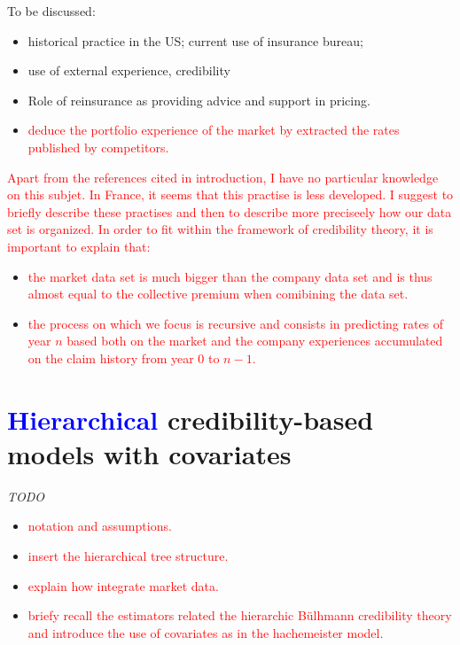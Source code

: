 \documentclass[
]{article}
\providecommand{\tightlist}{%
  \setlength{\itemsep}{0pt}\setlength{\parskip}{0pt}}
\begin{document}
To be discussed:

\begin{itemize}
\tightlist
\item
  historical practice in the US; current use of insurance bureau;
\item
  use of external experience, credibility
\item
  Role of reinsurance as providing advice and support in pricing.
\item
  \textcolor{red}{deduce the portfolio experience of the market by extracted the rates published by competitors.}
\end{itemize}

\textcolor{red}{Apart from the references cited in introduction, I have no particular knowledge on this subjet. In France, it seems that this practise is less developed. I suggest to briefly describe these practises and then to describe more preciseely how our data set is organized. In order to fit within the framework of credibility theory, it is important to explain that:}

\begin{itemize}
\tightlist
\item
  \textcolor{red}{the market data set is much bigger than the company data set and is thus almost equal to the collective premium when comibining the data set.}
\item
  \textcolor{red}{the process on which we focus is recursive and consists in predicting rates of year $n$ based both on the market and the company experiences accumulated on the claim history from year $0$ to $n-1$.}
\end{itemize}

\hypertarget{credibility-based-models-with-covariates}{%
\section{\texorpdfstring{\textcolor{blue}{Hierarchical}
credibility-based models with
covariates}{ credibility-based models with covariates}}\label{credibility-based-models-with-covariates}}

\emph{TODO}

\begin{itemize}
\tightlist
\item
  \textcolor{red}{notation and assumptions.}
\item
  \textcolor{red}{insert the hierarchical tree structure.}
\item
  \textcolor{red}{explain how integrate market data.}
\item
  \textcolor{red}{briefy recall the estimators related the hierarchic Bülhmann credibility theory and introduce the use of covariates as in the hachemeister model.}
\end{itemize}
\end{document}
